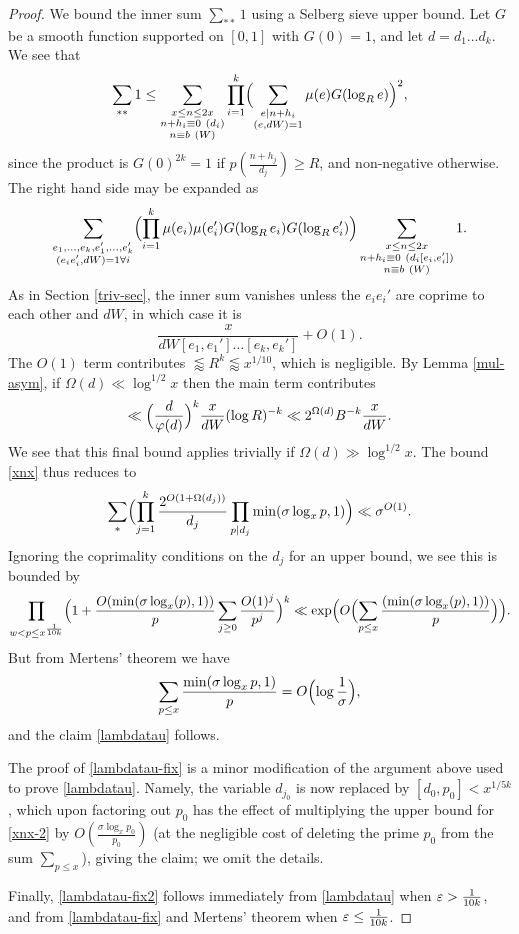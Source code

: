 \begin{proof}
We bound the inner sum $\sum_{**} 1$  using a Selberg sieve upper bound. Let $G$ be a smooth  function supported on $[0,1]$ with $G(0)=1$, and let $d=d_1\dots d_k$. We see that
$$\sum_{**} 1\le \sum_{\substack{x\le n\le 2x\\ n+h_i\equiv 0\ (d_i) \\ n\equiv b\ (W)}}\prod_{i=1}^k\Bigl(\sum_{\substack{e|n+h_i\\ (e,dW)=1}}\mu(e)G(\log_R{e})\Bigr)^2,$$
since the product is $G(0)^{2k}=1$ if $p( \frac{n+h_j}{d_j}) \geq R$, and non-negative otherwise. The right hand side may be expanded as
$$ \sum_{\substack{e_1,\dots,e_k,e_1',\dots,e_k'\\ (e_ie_i',dW)=1\forall i}}\Bigl(\prod_{i=1}^k\mu(e_i)\mu(e_i')G(\log_R{e_i})G(\log_R{e_i'})\Bigr)\sum_{\substack{x\le n\le 2x \\ n+h_i\equiv 0\ (d_i[e_i,e_i']) \\ n\equiv b\ (W)}}1.$$
As in Section \ref{triv-sec}, the inner sum vanishes unless the $e_ie_i'$ are coprime to each other and $dW$, in which case it is
$$\frac{x}{dW[e_1,e_1']\dots [e_k,e_k']}+O(1).$$
The $O(1)$ term contributes $\lessapprox R^k\lessapprox x^{1/10}$, which is negligible. By Lemma \ref{mul-asym}, if $\Omega(d)\ll \log^{1/2}{x}$ then the main term contributes
$$\ll \Bigl(\frac{d}{\phi(d)}\Bigr)^k\frac{x}{d W}(\log{R})^{-k}\ll 2^{\Omega(d)}B^{-k}\frac{x}{d W}.$$
We see that this final bound applies trivially if $\Omega(d)\gg \log^{1/2}{x}$. The bound \eqref{xnx} thus reduces to
\begin{equation}\label{xnx-2}
\sum_* \Bigl(\prod_{j=1}^k \frac{2^{O(1+\Omega(d_j))}}{d_j} \prod_{p|d_j} \min( \sigma \log_x p, 1 )\Bigr) \ll \sigma^{O(1)}.
\end{equation}
Ignoring the coprimality conditions on the $d_j$ for an upper bound, we see this is bounded by
$$ \prod_{w<p\le x^{\frac{1}{10k}}}\Bigl(1+\frac{O(\min(\sigma\log_x(p),1))}{p}\sum_{j\ge 0}\frac{O(1)^j}{p^j}\Bigr)^k \ll \exp\Bigl(O\Bigl(\sum_{p\le x}\frac{(\min(\sigma\log_x(p),1))}{p}\Bigr)\Bigr).$$
But from Mertens' theorem we have
$$ \sum_{p \leq x} \frac{\min(\sigma \log_x p, 1)}{p} = O\Bigl( \log \frac{1}{\sigma} \Bigr),$$
and the claim \eqref{lambdatau} follows.

The proof of \eqref{lambdatau-fix} is a minor modification of the argument above used to prove \eqref{lambdatau}.  
Namely, the variable $d_{j_0}$ is now replaced by $[d_0,p_0]<x^{1/5k}$, which upon factoring out $p_0$ has the effect of multiplying the upper bound for \eqref{xnx-2} by $O( \frac{\sigma \log_x p_0}{p_0})$ (at the negligible cost of deleting the prime $p_0$ from the sum $\sum_{p \leq x}$), giving the claim; we omit the details.

Finally, \eqref{lambdatau-fix2} follows immediately from \eqref{lambdatau} when $\eps > \frac{1}{10k}$, and from \eqref{lambdatau-fix} and Mertens' theorem when $\eps \leq \frac{1}{10k}$.
\end{proof}

